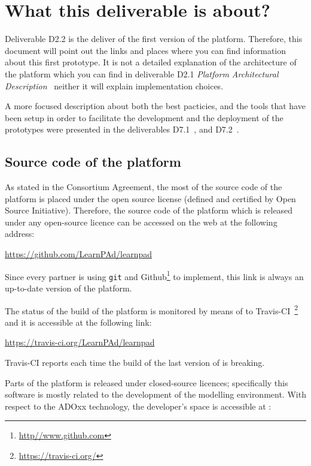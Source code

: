 \documentclass{learnpad}
\begin{document}
\chapter{What this deliverable is about?}
\label{ch:about}

Deliverable D2.2 is the deliver of the first version of the \learnpad platform.
Therefore, this document will point out the links and places where you can find
information about this first prototype.  It is not a detailed explanation of the
architecture of the platform which you can find in deliverable D2.1
\emph{Platform Architectural Description}~\cite{learnpad:D2.1} neither it will 
explain implementation choices.

A more focused description about both the best pacticies, and the tools 
that have been setup in order to facilitate the development and the deployment 
of the \learnpad prototypes were presented in the deliverables 
D7.1~\cite{learnpad:D7.1}, and D7.2~\cite{learnpad:D7.2}.

\section{Source code of the platform}
\label{sec:sourcecode}

As stated in the Consortium Agreement, the most of the source code of the 
platform is placed under the open source license (defined and certified by Open 
Source Initiative). Therefore, the source code of the \learnpad platform which 
is released under any open-source licence can be accessed on the web at the 
following address:

\url{https://github.com/LearnPAd/learnpad}

Since every partner is using \texttt{git} and 
Github\footnote{\url{http//www.github.com}} to implement, this link is
always an up-to-date version of the \learnpad platform.

The status of the build of the platform is monitored by means of to 
Travis-CI~\footnote{\url{https://travis-ci.org/}} and it is accessible at the 
following link:

\url{https://travis-ci.org/LearnPAd/learnpad}

Travis-CI reports each time the build of the last version of \learnpad is
breaking.

Parts of the \learnpad platform is released under closed-source licences;
specifically this software is mostly related to the development of the 
modelling environment. With respect to the ADOxx technology, the developer's
space is accessible at :
\end{document}
